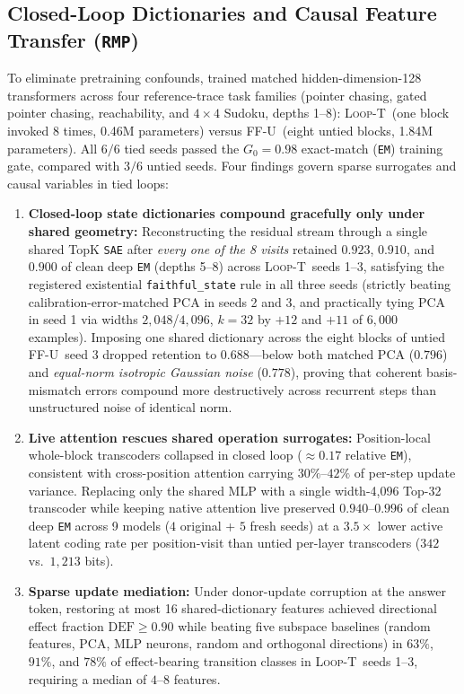 \documentclass[10pt,letterpaper]{article}
\newcommand{\LoopT}{\textsc{Loop-T}}
\newcommand{\FFU}{\textsc{FF-U}}
\newcommand{\DEF}{\ensuremath{\mathrm{DEF}}}
\begin{document}
\subsection{Closed-Loop Dictionaries and Causal Feature Transfer (\texttt{RMP})}

To eliminate pretraining confounds, \cite{dugan2026rmp} trained matched hidden-dimension-128 transformers across four reference-trace task families (pointer chasing, gated pointer chasing, reachability, and $4\times 4$ Sudoku, depths 1--8): \LoopT\ (one block invoked 8 times, 0.46M parameters) versus \FFU\ (eight untied blocks, 1.84M parameters). All $6/6$ tied seeds passed the $G_0 = 0.98$ exact-match (\texttt{EM}) training gate, compared with $3/6$ untied seeds. Four findings govern sparse surrogates and causal variables in tied loops:
\begin{enumerate}[topsep=3pt,itemsep=2pt]
  \item \textbf{Closed-loop state dictionaries compound gracefully only under shared geometry:} Reconstructing the residual stream through a single shared TopK \texttt{SAE} \cite{gao2024scaling} after \emph{every one of the 8 visits} retained $0.923$, $0.910$, and $0.900$ of clean deep \texttt{EM} (depths 5--8) across \LoopT\ seeds 1--3, satisfying the registered existential \texttt{faithful\_state} rule in all three seeds (strictly beating calibration-error-matched PCA in seeds 2 and 3, and practically tying PCA in seed 1 via widths $2{,}048$/$4{,}096$, $k=32$ by $+12$ and $+11$ of $6{,}000$ examples). Imposing one shared dictionary across the eight blocks of untied \FFU\ seed 3 dropped retention to $0.688$—below both matched PCA ($0.796$) and \emph{equal-norm isotropic Gaussian noise} ($0.778$), proving that coherent basis-mismatch errors compound more destructively across recurrent steps than unstructured noise of identical norm.
  \item \textbf{Live attention rescues shared operation surrogates:} Position-local whole-block transcoders collapsed in closed loop ($\approx 0.17$ relative \texttt{EM}), consistent with cross-position attention carrying $30\%$--$42\%$ of per-step update variance. Replacing only the shared MLP with a single width-4,096 Top-32 transcoder \cite{dunefsky2024transcoders} while keeping native attention live preserved $0.940$--$0.996$ of clean deep \texttt{EM} across 9 models ($4$ original + $5$ fresh seeds) at a $3.5\times$ lower active latent coding rate per position-visit than untied per-layer transcoders ($342$ vs.\ $1{,}213$ bits).
  \item \textbf{Sparse update mediation:} Under donor-update corruption at the answer token, restoring at most 16 shared-dictionary features achieved directional effect fraction $\DEF \ge 0.90$ while beating five subspace baselines (random features, PCA, MLP neurons, random and orthogonal directions) in $63\%$, $91\%$, and $78\%$ of effect-bearing transition classes in \LoopT\ seeds 1--3, requiring a median of $4$--$8$ features.

\end{enumerate}
\end{document}
